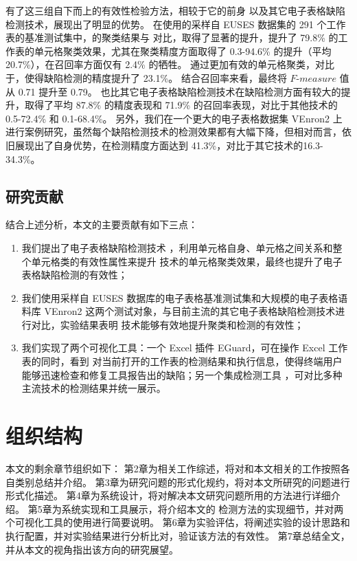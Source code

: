 有了这三组自下而上的有效性检验方法，\wa 相较于它的前身 \cu 以及其它电子表格缺陷检测技术，展现出了明显的优势。
在\cu 使用的采样自 EUSES \cite{fisher2005euses} 数据集的 291 个工作表的基准测试集中，\wa 的聚类结果与 \cu 对比，取得了显著的提升，提升了 79.8\% 的工作表的单元格聚类效果，尤其在聚类精度方面取得了 0.3-94.6\% 的提升（平均 20.7\%），在召回率方面仅有 2.4\% 的牺牲。
\wa 通过更加有效的单元格聚类，对比于\cu，使得缺陷检测的精度提升了 23.1\%。
结合召回率来看，最终将 $F\text{-}measure$ 值从 0.71 提升至 0.79。
\wa 也比其它电子表格缺陷检测技术在缺陷检测方面有较大的提升，取得了平均 87.8\% 的精度表现和 71.9\% 的召回率表现，对比于其他技术的 0.5-72.4\% 和 0.1-68.4\%。
另外，我们在一个更大的电子表格数据集 VEnron2 \cite{xu2017spreadcluster} 上进行案例研究，虽然每个缺陷检测技术的检测效果都有大幅下降，但相对而言，\wa 依旧展现出了自身优势，在检测精度方面达到 41.3\%，对比于其它技术的16.3-34.3\%。

\subsection{研究贡献}
结合上述分析，本文的主要贡献有如下三点：
\begin{enumerate}
    \item 我们提出了电子表格缺陷检测技术 \wa ，利用单元格自身、单元格之间关系和整个单元格类的有效性属性来提升 \cu 技术的单元格聚类效果，最终也提升了电子表格缺陷检测的有效性；
    \item 我们使用采样自 EUSES 数据库的电子表格基准测试集和大规模的电子表格语料库 VEnron2 这两个测试对象，与目前主流的其它电子表格缺陷检测技术进行对比，实验结果表明 \wa 技术能够有效地提升聚类和检测的有效性；
    \item 我们实现了两个可视化工具：一个 Excel 插件 EGuard，可在操作 Excel 工作表的同时，看到 \wa 对当前打开的工作表的检测结果和执行信息，使得终端用户能够迅速检查和修复工具报告出的缺陷；另一个集成检测工具 \sg ，可对比多种主流技术的检测结果并统一展示。
\end{enumerate}


\section{组织结构}
本文的剩余章节组织如下：
第2章为相关工作综述，将对和本文相关的工作按照各自类别总结并介绍。
第3章为研究问题的形式化规约，将对本文所研究的问题进行形式化描述。
第4章为系统设计，将对解决本文研究问题所用的方法进行详细介绍。
第5章为系统实现和工具展示，将介绍本文的 \wa 检测方法的实现细节，并对两个可视化工具的使用进行简要说明。
第6章为实验评估，将阐述实验的设计思路和执行配置，并对实验结果进行分析比对，验证该方法的有效性。
第7章总结全文，并从本文的视角指出该方向的研究展望。